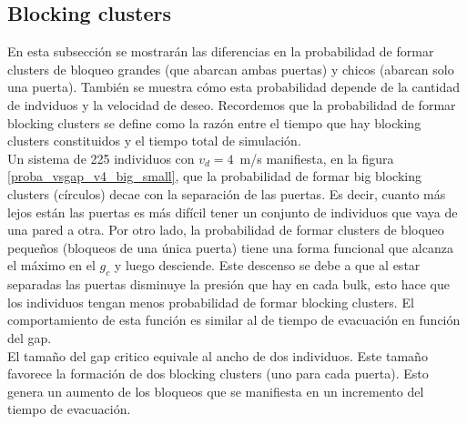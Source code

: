 \subsection{Blocking clusters}

En esta subsección se mostrarán las diferencias en la probabilidad de formar clusters de bloqueo grandes (que abarcan ambas puertas) y chicos (abarcan solo una puerta). También se muestra cómo esta probabilidad depende de la cantidad de indviduos y la velocidad de deseo. Recordemos que la probabilidad de formar blocking clusters se define como la razón entre el tiempo que hay blocking clusters constituidos y el tiempo total de simulación. \\

Un sistema de 225 individuos con $v_d=4$~m/s manifiesta, en la figura \ref{proba_vsgap_v4_big_small}, que la probabilidad de formar big blocking clusters (círculos) decae con la separación de las puertas. Es decir, cuanto más lejos están las puertas es más difícil tener un conjunto de individuos que vaya de una pared a otra.
Por otro lado, la probabilidad de formar clusters de bloqueo pequeños (bloqueos de una única puerta) tiene una forma funcional que alcanza el máximo en el $g_c$ y luego desciende. Este descenso se debe a que al estar separadas las puertas disminuye la presión que hay en cada bulk, esto hace que los individuos tengan menos probabilidad de formar blocking clusters. El comportamiento de esta función es similar al de tiempo de evacuación en función del gap.\\

El tamaño del gap critico equivale al ancho de dos individuos. Este tamaño favorece la formación de dos blocking clusters (uno para cada puerta). Esto genera un aumento de los bloqueos que se manifiesta en un incremento del tiempo de evacuación. 


